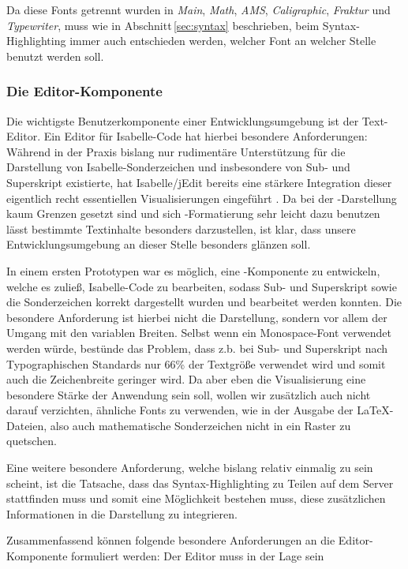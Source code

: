Da diese Fonts getrennt wurden in \textit{Main}, \textit{Math}, \textit{AMS}, \textit{Caligraphic},
\textit{Fraktur} und \textit{Typewriter}, muss wie in Abschnitt\,\ref{sec:syntax} beschrieben, beim
Syntax-Highlighting immer auch entschieden werden, welcher Font an welcher Stelle benutzt werden
soll.

\subsubsection{Die Editor-Komponente}
\label{sec:editor}

Die wichtigste Benutzerkomponente einer Entwicklungsumgebung ist der Text-Editor. Ein Editor für
Isabelle-Code hat hierbei besondere Anforderungen: Während in der Praxis bislang nur rudimentäre
Unterstützung für die Darstellung von Isabelle-Sonderzeichen und insbesondere von Sub- und
Superskript existierte, hat Isabelle/jEdit bereits eine stärkere Integration dieser eigentlich recht
essentiellen Visualisierungen eingeführt \cite{iscala}. Da bei der -Darstellung kaum
Grenzen gesetzt sind und sich -Formatierung sehr leicht dazu benutzen lässt bestimmte
Textinhalte besonders darzustellen, ist klar, dass unsere Entwicklungsumgebung an dieser Stelle
besonders glänzen soll.

In einem ersten Prototypen war es möglich, eine -Komponente zu entwickeln, welche es zuließ,
Isabelle-Code zu bearbeiten, sodass Sub- und Superskript sowie die Sonderzeichen korrekt dargestellt
wurden und bearbeitet werden konnten. Die besondere Anforderung ist hierbei nicht die Darstellung,
sondern vor allem der Umgang mit den variablen Breiten. Selbst wenn ein Monospace-Font verwendet
werden würde, bestünde das Problem, dass z.b. bei Sub- und Superskript nach Typographischen
Standards nur 66\% der Textgröße verwendet wird und somit auch die Zeichenbreite geringer wird. Da
aber eben die Visualisierung eine besondere Stärke der Anwendung sein soll, wollen wir zusätzlich
auch nicht darauf verzichten, ähnliche Fonts zu verwenden, wie in der Ausgabe der \LaTeX-Dateien,
also auch mathematische Sonderzeichen nicht in ein Raster zu quetschen.

Eine weitere besondere Anforderung, welche bislang relativ einmalig zu sein scheint, ist die
Tatsache, dass das Syntax-Highlighting zu Teilen auf dem Server stattfinden muss und somit eine
Möglichkeit bestehen muss, diese zusätzlichen Informationen in die Darstellung zu integrieren.

Zusammenfassend können folgende besondere Anforderungen an die Editor-Komponente formuliert werden:
Der Editor muss in der Lage sein


